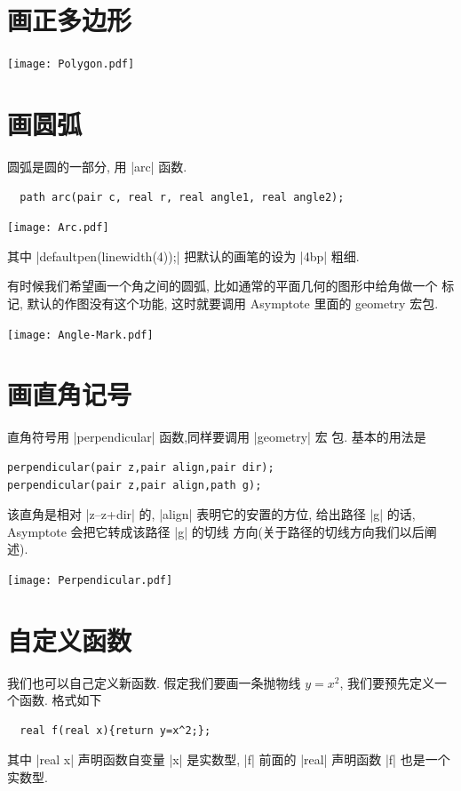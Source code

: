 \documentclass{ctexbook}
\begin{document}
\section{画正多边形}
\begin{center}\texttt{[image: Polygon.pdf]}\end{center}%


\section{画圆弧}
圆弧是圆的一部分, 用 |arc| 函数.
\begin{lstlisting}
  path arc(pair c, real r, real angle1, real angle2);
\end{lstlisting}

\begin{center}\texttt{[image: Arc.pdf]}\end{center}%


其中 |defaultpen(linewidth(4));| 把默认的画笔的设为 |4bp| 粗细.

有时候我们希望画一个角之间的圆弧, 比如通常的平面几何的图形中给角做一个
标记, 默认的作图没有这个功能, 这时就要调用 Asymptote 里面的 geometry 宏包.
\begin{center}\texttt{[image: Angle-Mark.pdf]}\end{center}%


\section{画直角记号}
直角符号用 |perpendicular| 函数,同样要调用 |geometry| 宏
包. 基本的用法是
\begin{verbatim}
perpendicular(pair z,pair align,pair dir);
perpendicular(pair z,pair align,path g);
\end{verbatim}
该直角是相对 |z--z+dir| 的, |align| 表明它的安置的方位,
给出路径 |g| 的话, Asymptote 会把它转成该路径 |g| 的切线
方向(关于路径的切线方向我们以后阐述).
\begin{center}\texttt{[image: Perpendicular.pdf]}\end{center}%


\section{自定义函数}
我们也可以自己定义新函数. 假定我们要画一条抛物线 $y=x^{2}$, 我们要预先定义一个函数. 格式如下
\begin{lstlisting}
  real f(real x){return y=x^2;};
\end{lstlisting}
其中 |real x| 声明函数自变量 |x| 是实数型, |f| 前面的
|real| 声明函数 |f| 也是一个实数型.
\end{document}
